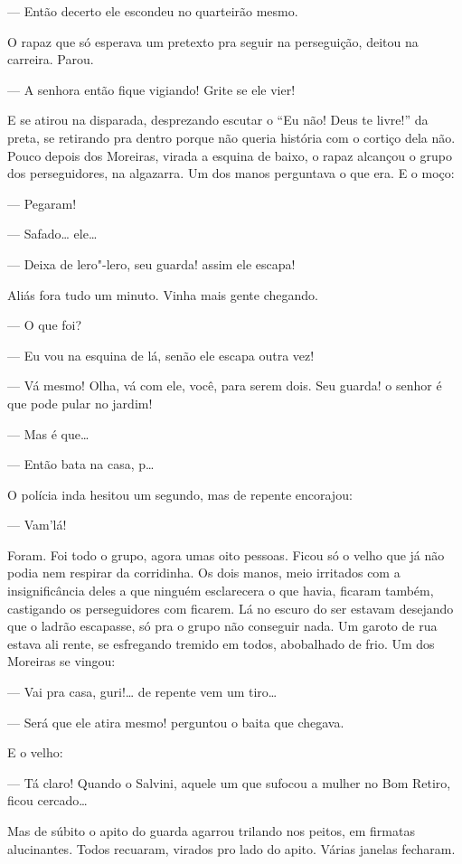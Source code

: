 \begin{linenumbers}
--- Então decerto ele escondeu no quarteirão mesmo.

O rapaz que só esperava um pretexto pra seguir na perseguição, deitou na
carreira. Parou.

--- A senhora então fique vigiando! Grite se ele vier!

E se atirou na disparada, desprezando escutar o ``Eu não! Deus te
livre!'' da preta, se retirando pra dentro porque não queria história
com o cortiço dela não. Pouco depois dos Moreiras, virada a esquina de
baixo, o rapaz alcançou o grupo dos perseguidores, na algazarra. Um dos
manos perguntava o que era. E o moço:

--- Pegaram!

--- Safado\ldots{} ele\ldots{}

--- Deixa de lero"-lero, seu guarda! assim ele escapa!

Aliás fora tudo um minuto. Vinha mais gente chegando.

--- O que foi?

--- Eu vou na esquina de lá, senão ele escapa outra vez!

--- Vá mesmo! Olha, vá com ele, você, para serem dois. Seu guarda! o
senhor é que pode pular no jardim!

--- Mas é que\ldots{}

--- Então bata na casa, p\ldots{}

O polícia inda hesitou um segundo, mas de repente encorajou:

--- Vam'lá!

Foram. Foi todo o grupo, agora umas oito pessoas. Ficou só o velho que
já não podia nem respirar da corridinha. Os dois manos, meio irritados
com a insignificância deles a que ninguém esclarecera o que havia,
ficaram também, castigando os perseguidores com ficarem. Lá no escuro do
ser estavam desejando que o ladrão escapasse, só pra o grupo não
conseguir nada. Um garoto de rua estava ali rente, se esfregando tremido
em todos, abobalhado de frio. Um dos Moreiras se vingou:

--- Vai pra casa, guri!\ldots{} de repente vem um tiro\ldots{}

--- Será que ele atira mesmo! perguntou o baita que chegava.

E o velho:

--- Tá claro! Quando o Salvini, aquele um que sufocou a mulher no Bom
Retiro, ficou cercado\ldots{}

Mas de súbito o apito do guarda agarrou trilando nos peitos, em firmatas
alucinantes. Todos recuaram, virados pro lado do apito. Várias janelas
fecharam.


\end{linenumbers}
